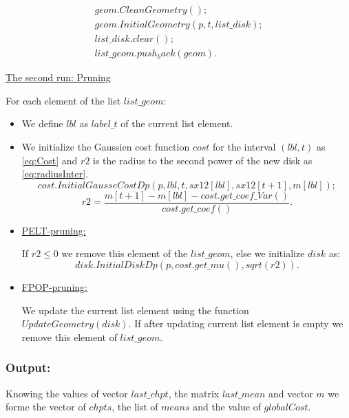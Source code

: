 \documentclass{report}
\begin{document}
\begin{itemize}
	\begin{equation}
		\begin{gathered}
			geom.CleanGeometry();  \\       
			geom.InitialGeometry(p,t,list\_disk);  \\ 
			list\_disk.clear();  \\ 
			list\_geom.push_back(geom).
		\label{eq:firstgeom}
	\end{gathered}
	\end{equation}	

	\underline {The second run: Pruning}
	
	For each element of the list $list\_geom$:
	\begin{itemize}
		\item We define  $lbl$ as $label\_t$  of the current list element.
		\item We initialize the Gaussien cost function $cost$ for the interval $(lbl,t)$ as \ref{eq:Cost} and $r2$ is the radius to the second power of the new disk as \ref{eq:radiusInter}.
		\begin{equation}
			cost.InitialGausseCostDp(p, lbl, t, sx12[lbl], sx12[t + 1], m[lbl]);
			\label{eq:Cost}
		\end{equation}
		\begin{equation}
			r2= \frac {m[t + 1] - m[lbl] - cost.get\_coef\_Var()}{   cost.get\_coef()}.
			\label{eq:radiusInter}
		\end{equation}
		
		 \item \underline {PELT-pruning:} 
		 
		 If $r2 \le 0$ we remove this element of the $list\_geom$, else we initialize $disk$ as:
		 \begin{equation}
			 disk.InitialDiskDp(p, cost.get\_mu(), sqrt(r2)).
		 \end{equation}
		 
		\item \underline {FPOP-pruning:} 
		
		We update the current list element using the function $UpdateGeometry(disk)$. If after updating current list element is empty we remove this element of $list\_geom$. 	
	\end{itemize} 
	\end{itemize} 
	
	\subsubsection*{Output:}

	Knowing the values of  vector  $last\_chpt$, the matrix $last\_mean$ and vector  $m$ we forme the vector of $chpts$, the list of $means$ and the value of $globalCost$.
\end{document}
